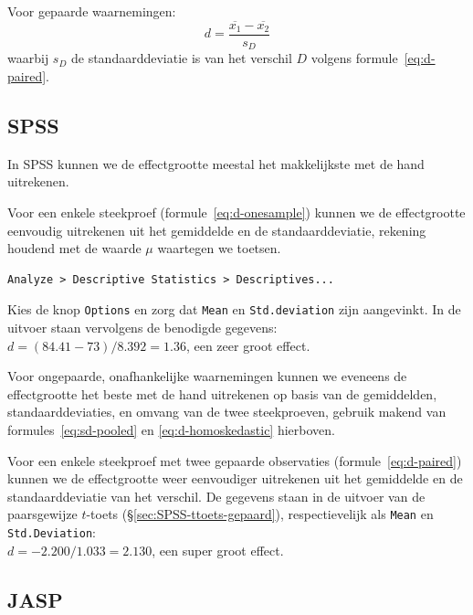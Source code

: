 \documentclass[
]{book}
\begin{document}
Voor gepaarde waarnemingen:
\begin{equation}
  \label{eq:d-paired}
  d = \frac{ \overline{x_1}-\overline{x_2} } { s_D }
\end{equation}
waarbij \(s_D\) de
standaarddeviatie is van het verschil \(D\) volgens
formule~\eqref{eq:d-paired}.

\hypertarget{spss-13-2}{%
\subsection{SPSS}\label{spss-13-2}}

In SPSS kunnen we de effectgrootte meestal het makkelijkste met de hand
uitrekenen.

Voor een enkele steekproef
(formule~\eqref{eq:d-onesample}) kunnen we de effectgrootte eenvoudig
uitrekenen uit het gemiddelde en de standaarddeviatie, rekening houdend
met de waarde \(\mu\) waartegen we toetsen.

\begin{verbatim}
Analyze > Descriptive Statistics > Descriptives...
\end{verbatim}

Kies de knop \texttt{Options} en zorg dat \texttt{Mean} en \texttt{Std.deviation} zijn
aangevinkt. In de uitvoer staan vervolgens de benodigde gegevens:\\
\(d = (84.41 - 73) / 8.392 = 1.36\), een zeer groot effect.

Voor ongepaarde, onafhankelijke waarnemingen kunnen we eveneens de
effectgrootte het beste met de hand uitrekenen op basis van de
gemiddelden, standaarddeviaties, en omvang van de twee steekproeven,
gebruik makend van
formules~\eqref{eq:sd-pooled} en
\eqref{eq:d-homoskedastic} hierboven.

Voor een enkele steekproef met twee gepaarde observaties
(formule~\eqref{eq:d-paired}) kunnen we de effectgrootte weer eenvoudiger
uitrekenen uit het gemiddelde en de standaarddeviatie van het verschil.
De gegevens staan in de uitvoer van de paarsgewijze \(t\)-toets
(§\ref{sec:SPSS-ttoets-gepaard}), respectievelijk als \texttt{Mean} en
\texttt{Std.Deviation}:\\
\(d = -2.200 / 1.033 = 2.130\), een super groot effect.

\hypertarget{jasp-13}{%
\subsection{JASP}\label{jasp-13}}
\end{document}

